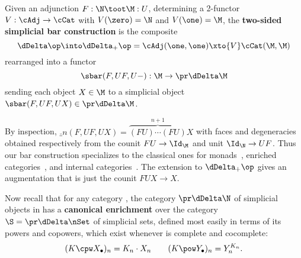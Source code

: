 \begin{defn}
  Given an adjunction $F:\N \toot \M:U$, determining a 2-functor $V : \cAdj\to\cCat$ with $V(\zero)=\N$ and $V(\one)=\M$, the \textbf{two-sided simplicial bar construction} is the composite
  \[ \dDelta\op \into \dDelta_+\op = \cAdj(\one,\one) \xto{V} \cCat(\M,\M) \]
  rearranged into a functor
  \[ \sbar(F,UF,U-) : \M \to \pr\dDelta\M \]
  sending each object $X\in \M$ to a simplicial object $\sbar(F,UF,UX)\in \pr\dDelta\M$.
\end{defn}

By inspection,
\( \bar_n(F,UF,UX) = \overbrace{(FU)\dotsm(FU)}^{n+1} X \)
with faces and degeneracies obtained respectively from the counit $FU\to\Id_\M$ and unit $\Id_\N\to UF$.
Thus our bar construction specializes to the classical ones for monads~\cite{may:goils,meyer:bar_i}, enriched categories~\cite{cp:hcct,shulman:htpylim}, and internal categories~\cite{may:csf,horel:model-intsscat}.
The extension to $\dDelta_+\op$ gives an augmentation that is just the counit $FUX \to X$.

Now recall that for any category \N, the category $\pr\dDelta\N$ of simplicial objects in \N has a \textbf{canonical enrichment} over the category $\S=\pr\dDelta\nSet$ of simplicial sets, %
defined most easily in terms of its powers and copowers, which exist whenever \N is complete and cocomplete:
\[
  (K\cpw X_\bullet)_n = K_n \cdot X_n \qquad
  (K\pow Y_\bullet)_n = Y_n^{K_n}.
\]


